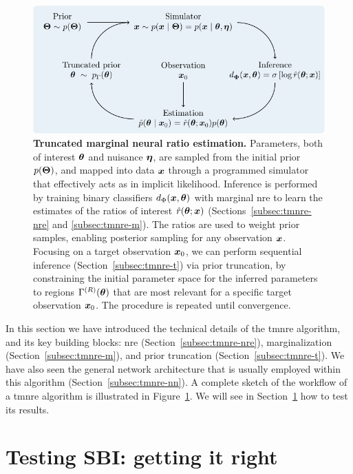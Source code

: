 \begin{figure}
	\centering
	\includegraphics[width=\linewidth]{TikZ/tmnre.pdf}
	\caption{\textbf{Truncated marginal neural ratio estimation.} Parameters, both of interest $\bm{\theta}$ and nuisance $\bm{\eta}$, are sampled from the initial prior $p(\bm{\Theta})$, and mapped into data $\bm{x}$ through a programmed simulator that effectively acts as in implicit likelihood. Inference is performed by training binary classifiers $d_\Phi(\bm{x}, \bm{\theta})$ with marginal \gls*{nre} to learn the estimates of the ratios of interest $\hat{r}(\bm{\theta};\bm{x})$ (Sections~\ref{subsec:tmnre-nre} and \ref{subsec:tmnre-m}). The ratios are used to weight prior samples, enabling posterior sampling for any observation $\bm{x}$. Focusing on a target observation $\bm{x}_0$, we can perform sequential inference (Section~\ref{subsec:tmnre-t}) via prior truncation, by constraining the initial parameter space for the inferred parameters to regions $\Gamma^{(R)}(\bm{\theta})$ that are most relevant for a specific target observation $\bm{x}_0$. The procedure is repeated until convergence.
}
\label{fig:sbi-tmnre}
\end{figure}

In this section we have introduced the technical details of the \gls*{tmnre} algorithm, and its key building blocks: \gls*{nre} (Section~\ref{subsec:tmnre-nre}), marginalization  (Section~\ref{subsec:tmnre-m}), and prior truncation  (Section~\ref{subsec:tmnre-t}). We have also seen the general network architecture that is usually employed within this algorithm (Section~\ref{subsec:tmnre-nn}). A complete sketch of the workflow of a \gls*{tmnre} algorithm is illustrated in Figure~\ref{fig:sbi-tmnre}. We will see in Section~\ref{sec:test} how to test its results.



\section{Testing SBI: getting it right} \label{sec:test}

